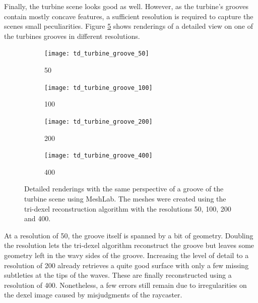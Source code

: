 Finally, the turbine scene looks good as well.
However, as the turbine's grooves contain mostly concave features, a sufficient resolution is required to capture the scenes small peculiarities.
Figure \ref{fig:td_grooves} shows renderings of a detailed view on one of the turbines grooves in different resolutions.
%
\begin{figure}
	\centering
	\begin{subfigure}[b]{0.24\textwidth}
		\centering
		\texttt{[image: td\_turbine\_groove\_50]}
		\caption{50}
		\label{fig:td_turbine_groove_50}
	\end{subfigure}
	\begin{subfigure}[b]{0.24\textwidth}
		\centering
		\texttt{[image: td\_turbine\_groove\_100]}
		\caption{100}
		\label{fig:td_turbine_groove_100}
	\end{subfigure}
	\begin{subfigure}[b]{0.24\textwidth}
		\centering
		\texttt{[image: td\_turbine\_groove\_200]}
		\caption{200}
		\label{fig:td_turbine_groove_200}
	\end{subfigure}
	\begin{subfigure}[b]{0.24\textwidth}
		\centering
		\texttt{[image: td\_turbine\_groove\_400]}
		\caption{400}
		\label{fig:td_turbine_groove_400}
	\end{subfigure}
	\caption{
		Detailed renderings with the same perspective of a groove of the turbine scene using MeshLab.
		The meshes were created using the tri-dexel reconstruction algorithm with the resolutions 50, 100, 200 and 400.
	}
	\label{fig:td_grooves}
\end{figure}
%
At a resolution of 50, the groove itself is spanned by a bit of geometry.
Doubling the resolution lets the tri-dexel algorithm reconstruct the groove but leaves some geometry left in the wavy sides of the groove.
Increasing the level of detail to a resolution of 200 already retrieves a quite good surface with only a few missing subtleties at the tips of the waves.
These are finally reconstructed using a resolution of 400.
Nonetheless, a few errors still remain due to irregularities on the dexel image caused by misjudgments of the raycaster.

